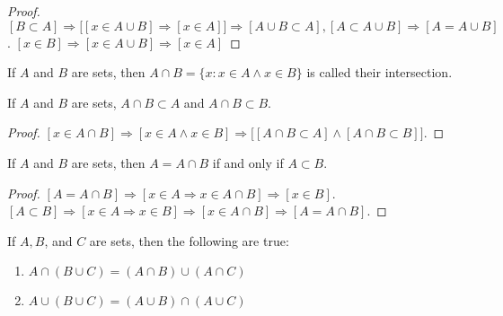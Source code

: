             \begin{proof}
                $[B\subset A]\Rightarrow\big[[x\in A\cup B]%
                 \Rightarrow[x\in A]\big]%
                 \Rightarrow[A\cup B \subset A],[A\subset A\cup B]%
                 \Rightarrow[A=A\cup B]$.
                $[x\in B] \Rightarrow [x\in A\cup B]%
                 \Rightarrow [x\in A]$
            \end{proof}
            \begin{definition}
                If $A$ and $B$ are sets, then
                $A\cap{B}=\{x:x\in{A}\land{x}\in{B}\}$
                is called their intersection.
            \end{definition}
            \begin{corollary}
                If $A$ and $B$ are sets,
                $A\cap{B}\subset{A}$ and $A\cap{B}\subset{B}$.
            \end{corollary}
            \begin{proof}
                $[x\in A\cap B]\Rightarrow[x\in A\land x\in B]%
                 \Rightarrow\big[[A\cap B \subset A]%
                 \land[A\cap B \subset B]\big]$.
            \end{proof}
            \begin{theorem}
                If $A$ and $B$ are sets, then $A=A\cap{B}$
                if and only if $A\subset{B}$.
            \end{theorem}
            \begin{proof}
            $[A=A\cap B]\Rightarrow [x\in A\Rightarrow x\in A \cap B]\Rightarrow [x\in B]$. $[A\subset B]\Rightarrow [x\in A\Rightarrow x\in B]\Rightarrow [x\in A\cap B]\Rightarrow [A=A\cap B]$.
            \end{proof}
            \begin{theorem}
            If $A,B$, and $C$ are sets, then the following are true:
            \begin{enumerate}
            \item $A\cap (B\cup C) = (A\cap B)\cup (A\cap C)$
            \item $A\cup (B\cup C) = (A\cup B)\cap (A\cup C)$
            \end{enumerate}
            \end{theorem}
